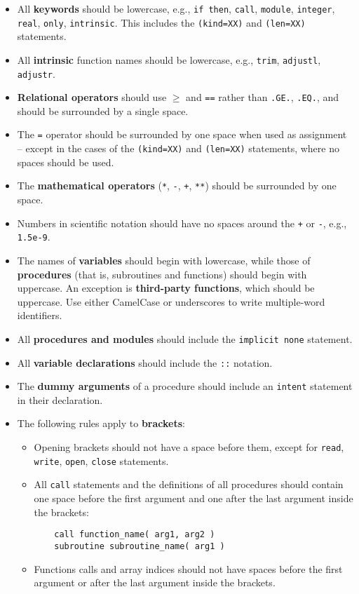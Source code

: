 \begin{itemize}
\item All \textbf{keywords} should be lowercase, e.g., \texttt{if\
    then}, \texttt{call}, \texttt{module}, \texttt{integer},
  \texttt{real}, \texttt{only}, \texttt{intrinsic}. This includes the
  \texttt{(kind=XX)} and \texttt{(len=XX)} statements.
\item All \textbf{intrinsic} function names should be lowercase, e.g.,
  \texttt{trim}, \texttt{adjustl}, \texttt{adjustr}.
\item \textbf{Relational operators} should use \texttt{$\geq$} and
  \texttt{==} rather than \texttt{.GE.}, \texttt{.EQ.}, and should be
  surrounded by a single space.
\item The \texttt{=} operator should be surrounded by one space when
  used as assignment -- except in the cases of the \texttt{(kind=XX)}
  and \texttt{(len=XX)} statements, where no spaces should be used.
\item The \textbf{mathematical operators} (\texttt{*}, \texttt{-},
  \texttt{+}, \texttt{**}) should be surrounded by one space.
\item Numbers in scientific notation should have no spaces around the
  \texttt{+} or \texttt{-}, e.g., \texttt{1.5e-9}.
\item The names of \textbf{variables} should begin with lowercase,
  while those of \textbf{procedures} (that is, subroutines and
  functions) should begin with uppercase. An exception is
  \textbf{third-party functions}, which should be uppercase. Use
  either CamelCase or underscores to write multiple-word identifiers.
\item All \textbf{procedures and modules} should include the
  \texttt{implicit none} statement.
\item All \textbf{variable declarations} should include the
  \texttt{::} notation.
\item The \textbf{dummy arguments} of a procedure should include an
  \texttt{intent} statement in their declaration.
\item The following rules apply to \textbf{brackets}:
  \begin{itemize}
  \item Opening brackets should not have a space before them, except
    for \texttt{read}, \texttt{write}, \texttt{open}, \texttt{close}
    statements.
  \item All \texttt{call} statements and the definitions of all
    procedures should contain one space before the first argument and
    one after the last argument inside the brackets:
    \begin{verbatim}
    call function_name( arg1, arg2 )
    subroutine subroutine_name( arg1 )
    \end{verbatim}
  \item Functions calls and array indices should not have spaces
    before the first argument or after the last argument inside the
    brackets.
  \end{itemize}
\end{itemize}
